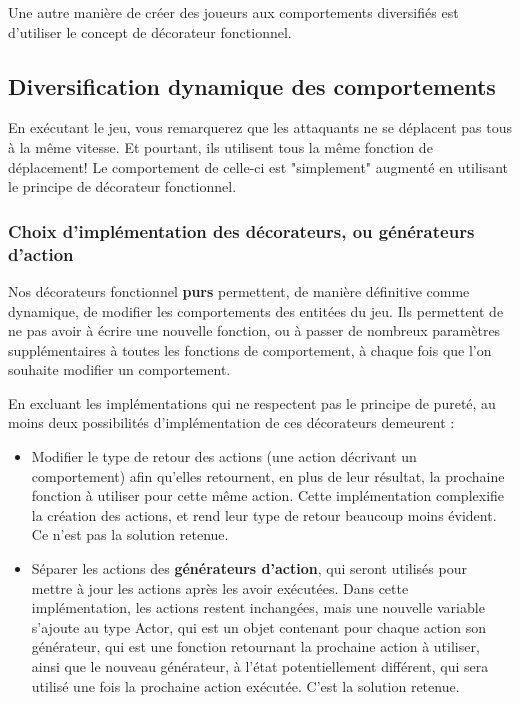 \documentclass{article}
\begin{document}
Une autre manière de créer des joueurs aux comportements diversifiés est d'utiliser le concept de décorateur fonctionnel.


\subsection{Diversification dynamique des comportements}

En exécutant le jeu, vous remarquerez que les attaquants ne se déplacent pas tous à la même vitesse. Et pourtant, ils utilisent tous la même fonction de déplacement! Le comportement de celle-ci est "simplement" augmenté en utilisant le principe de décorateur fonctionnel.  

\subsubsection{Choix d'implémentation des décorateurs, ou générateurs d'action}

Nos décorateurs fonctionnel \textbf{purs} permettent, de manière définitive comme dynamique, de modifier les comportements des entitées du jeu.
Ils permettent de ne pas avoir à écrire une nouvelle fonction, ou à passer de nombreux paramètres supplémentaires à toutes les fonctions de comportement, à chaque fois que l'on souhaite modifier un comportement.

En excluant les implémentations qui ne respectent pas le principe de pureté, au moins deux possibilités d'implémentation de ces décorateurs demeurent :
\begin{itemize}
    \item Modifier le type de retour des actions (une action décrivant un comportement) afin qu'elles retournent, en plus de leur résultat, la prochaine fonction à utiliser pour cette même action. Cette implémentation complexifie la création des actions, et rend leur type de retour beaucoup moins évident. Ce n'est pas la solution retenue. \label{text:decorateur1}
    \item Séparer les actions des \textbf{générateurs d'action}, qui seront utilisés pour mettre à jour les actions après les avoir exécutées. Dans cette implémentation, les actions restent inchangées, mais une nouvelle variable s'ajoute au type Actor, qui est un objet contenant pour chaque action son générateur, qui est une fonction retournant la prochaine action à utiliser, ainsi que le nouveau générateur, à l'état potentiellement différent, qui sera utilisé une fois la prochaine action exécutée. C'est la solution retenue.
\end{itemize}
\end{document}
